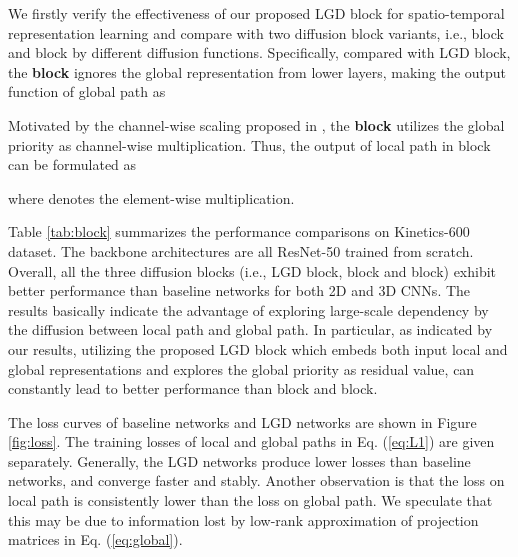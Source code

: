 \documentclass[10pt,twocolumn,letterpaper]{article}
\begin{document}
We firstly verify the effectiveness of our proposed LGD block for spatio-temporal representation learning and compare with two diffusion block variants, i.e., block and block by different diffusion functions. Specifically, compared with LGD block, the \textbf{block} ignores the global representation from lower layers, making the output function of global path as

Motivated by the channel-wise scaling proposed in \cite{hu2018squeeze}, the \textbf{block} utilizes the global priority as channel-wise multiplication. Thus, the output of local path in block can be formulated as

where  denotes the element-wise multiplication.

Table \ref{tab:block} summarizes the performance comparisons on Kinetics-600 dataset. The backbone architectures are all ResNet-50 trained from scratch. Overall, all the three diffusion blocks (i.e., LGD block, block and block) exhibit better performance than baseline networks for both 2D and 3D CNNs. The results basically indicate the advantage of exploring large-scale dependency by the diffusion between local path and global path. In particular, as indicated by our results, utilizing the proposed LGD block which embeds both input local and global representations and explores the global priority as residual value, can constantly lead to better performance than block and block.

The loss curves of baseline networks and LGD networks are shown in Figure \ref{fig:loss}. The training losses of local and global paths in Eq. (\ref{eq:L1}) are given separately. Generally, the LGD networks produce lower losses than baseline networks, and converge faster and stably. Another observation is that the loss on local path is consistently lower than the loss on global path. We speculate that this may be due to information lost by low-rank approximation of projection matrices in Eq. (\ref{eq:global}).
\end{document}
